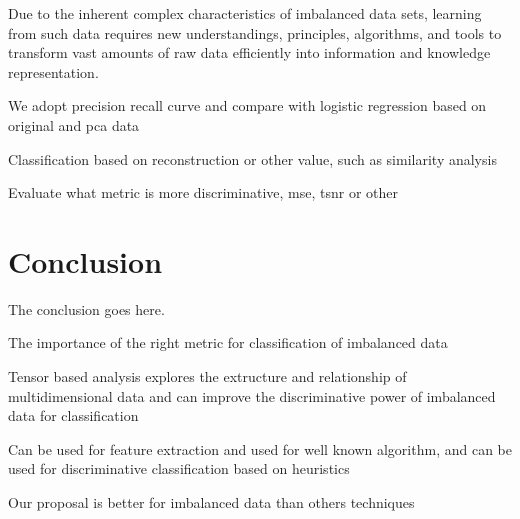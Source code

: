 Due to the inherent complex characteristics of imbalanced data sets, learning from such data requires new understandings, principles, algorithms, and tools to transform vast amounts of raw data efficiently into information and knowledge representation.

We adopt precision recall curve and compare with logistic regression based on original and pca data

Classification based on reconstruction or other value, such as similarity analysis

Evaluate what metric is more discriminative, mse, tsnr or other


\section{Conclusion}
\label{sec:4_conclusion}

The conclusion goes here.

The importance of the right metric for classification of imbalanced data

Tensor based analysis explores the extructure and relationship of multidimensional data and can improve the discriminative power of imbalanced data for classification

Can be used for feature extraction and used for well known algorithm,  and can be used for discriminative classification based on heuristics

Our proposal is better for imbalanced data than others techniques

